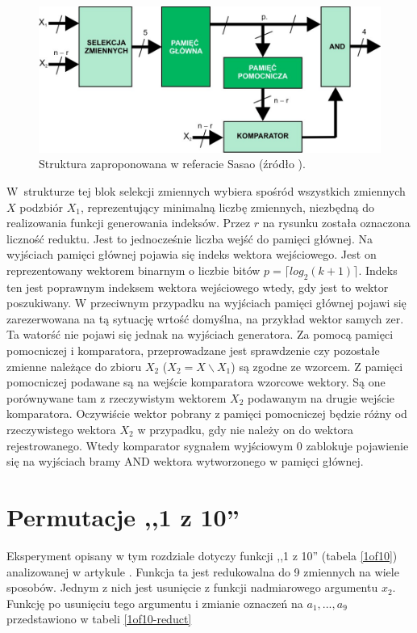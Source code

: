 \begin{figure}[H]
\centering
\includegraphics[width = 13cm]{chapter04/sasao-structure.jpg}
\caption{Struktura zaproponowana w referacie Sasao (źródło \cite{sasao-workshop}).}
\label{fig:sasao-structure}
\end{figure}

W~strukturze tej blok selekcji zmiennych wybiera spośród wszystkich zmiennych $X$ podzbiór $X_1$,
reprezentujący minimalną liczbę zmiennych,
niezbędną do realizowania funkcji generowania indeksów.
Przez $r$ na rysunku została oznaczona liczność reduktu.
Jest to jednocześnie liczba wejść do pamięci głównej.
Na wyjściach pamięci głównej pojawia się indeks wektora wejściowego. %
Jest on reprezentowany wektorem binarnym o liczbie bitów $p = \lceil log_2 (k+1)\rceil$.
Indeks ten jest poprawnym indeksem wektora wejściowego wtedy,
gdy jest to wektor poszukiwany.
W przeciwnym przypadku na wyjściach pamięci głównej pojawi się zarezerwowana na tą sytuację wrtość domyślna,
na przykład wektor samych zer.
Ta watorść nie pojawi się jednak na wyjściach generatora.
Za pomocą pamięci pomocniczej i komparatora,
przeprowadzane jest sprawdzenie czy pozostałe zmienne należące do zbioru $X_2$ ($X_2 = X \backslash X_1$) są zgodne ze wzorcem.
Z pamięci pomocniczej podawane są na wejście komparatora wzorcowe wektory.
Są one porównywane tam z rzeczywistym wektorem $X_2$ podawanym na drugie wejście komparatora.
Oczywiście wektor pobrany z pamięci pomocniczej będzie różny od rzeczywistego wektora $X_2$ w przypadku,
gdy nie należy on do wektora rejestrowanego.
Wtedy komparator sygnałem wyjściowym 0 zablokuje pojawienie się na wyjściach bramy AND wektora wytworzonego w pamięci głównej.

\section{Permutacje ,,1 z 10''}

Eksperyment opisany w tym rozdziale dotyczy funkcji ,,1 z 10'' (tabela \ref{1of10}) analizowanej w artykule \cite{sasao-s-min}.
Funkcja ta jest redukowalna do 9 zmiennych na wiele sposobów.
Jednym z nich jest usunięcie z funkcji nadmiarowego argumentu $x_2$.
Funkcję po usunięciu tego argumentu i zmianie oznaczeń na $a_1, ..., a_9$ przedstawiono w tabeli \ref{1of10-reduct}

